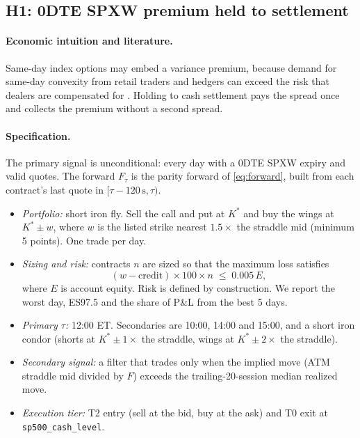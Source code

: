 \documentclass[../main.tex]{subfiles}
\begin{document}
\subsection{H1: 0DTE SPXW premium held to settlement}\label{sec:h1}

\paragraph{Economic intuition and literature.}
Same-day index options may embed a variance premium, because demand for same-day convexity from retail traders and hedgers can exceed the risk that dealers are compensated for \citep{bandi2023,beckmeyer2023,vilkov2023}. Holding to cash settlement pays the spread once and collects the premium without a second spread.

\paragraph{Specification.}
The primary signal is unconditional: every day with a 0DTE SPXW expiry and valid quotes. The forward $F_\tau$ is the parity forward of \eqref{eq:forward}, built from each contract's last quote in $[\tau - 120\,\mathrm{s}, \tau)$.
\begin{itemize}
\item \emph{Portfolio:} short iron fly. Sell the call and put at $K^{*}$ and buy the wings at $K^{*} \pm w$, where $w$ is the listed strike nearest $1.5 \times$ the straddle mid (minimum 5 points). One trade per day.
\item \emph{Sizing and risk:} contracts $n$ are sized so that the maximum loss satisfies
\begin{equation}
(w - \text{credit}) \times 100 \times n \;\le\; 0.005\,E,
\end{equation}
where $E$ is account equity. Risk is defined by construction. We report the worst day, ES97.5 and the share of P\&L from the best 5 days.
\item \emph{Primary $\tau$:} 12:00 ET. Secondaries are 10:00, 14:00 and 15:00, and a short iron condor (shorts at $K^{*} \pm 1 \times$ the straddle, wings at $K^{*} \pm 2 \times$ the straddle).
\item \emph{Secondary signal:} a filter that trades only when the implied move (ATM straddle mid divided by $F$) exceeds the trailing-20-session median realized move.
\item \emph{Execution tier:} T2 entry (sell at the bid, buy at the ask) and T0 exit at \texttt{sp500\_cash\_level}.
\end{itemize}
\end{document}
